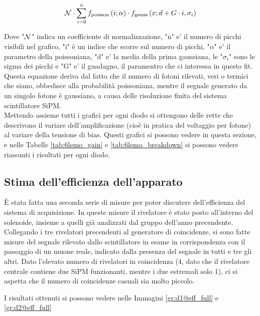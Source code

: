 \begin{equation}
	{\cal N}\cdot\sum_{i=0}^{n}f_{\mathrm{poisson}}\left(i;\alpha\right)\cdot f_{\mathrm{gauss}}\left(x; d + G\cdot i, \sigma_i\right)
	\label{eq:segnale_buio}
\end{equation}

Dove "${\cal N}$" indica un coefficiente di normalizzazione, "n" e' il numero di picchi visibili nel grafico, "i" \`e un indice che scorre sul numero di picchi, "$\alpha$" e' il parametro della poissoniana, "d" e' la media della prima gaussiana, le "$\sigma_i$" sono le sigma dei picchi e "G" e' il guadagno, il paramentro che ci interessa in questo fit. Questa equazione deriva dal fatto che il numero di fotoni rilevati, veri o termici che siano, obbedisce alla probabilit\`a poissoniana, mentre il segnale generato da un singolo fotone \`e gaussiano, a causa delle risoluzione finita del sistema scintillatore SiPM.\\

Mettendo assieme tutti i grafici per ogni diodo si ottengono delle rette che descrivono il variare dell'amplificazione (cioè in pratica del voltaggio per fotone) al variare
della tensione di bias. Questi grafici si possono vedere in questa sezione, e nelle Tabelle \ref{tab:6lemo_gain} e \ref{tab:6lemo_breakdown} si possono vedere riassunti i risultati per ogni diodo.

\subsection{Stima dell'efficienza dell'apparato}
\`E stata fatta una seconda serie di misure per poter discutere dell'efficienza del sistema di acquisizione. In queste misure il rivelatore \`e stato posto all'interno del solenoide, insieme a quelli gi\`a analizzati dal gruppo dell'anno precendente. Collegando i tre rivelatori precendenti al generatore di coincidenze, si sono fatte misure del segnale rilevato dallo scintillatore in esame in corrispondenza con il passaggio di un muone reale, indicato dalla presenza del segnale in tutti e tre gli altri. Dato l'elevato numero di rivelatori in coincidenza (4, dato che il rivelatore centrale contiene due SiPM funzionanti, mentre i due estremali solo 1), ci si aspetta che il numero di coincidenze casuali sia molto piccolo.

I risultati ottenuti si possono vedere nelle Immagini \ref{gr:d1@eff_full} e \ref{gr:d2@eff_full}

